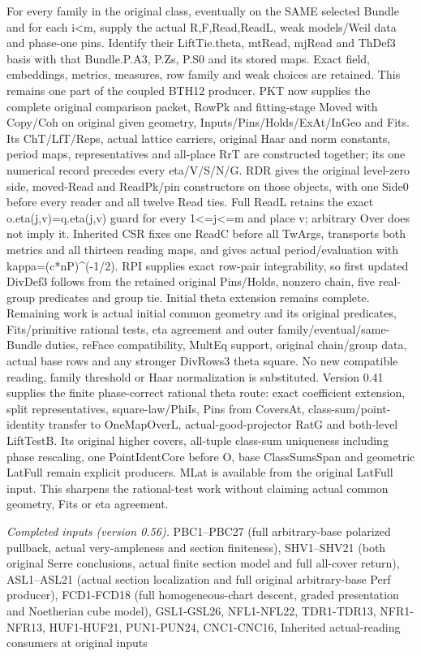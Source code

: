 \documentclass[11pt,a4paper]{article}
\numberwithin{equation}{section}
\theoremstyle{remark}\newtheorem{remark}[theorem]{Remark}
\begin{document}
For every family in the original class, eventually on the SAME selected Bundle and for each i<m, supply the actual R,F,Read,ReadL, weak models/Weil data and phase-one pins. Identify their LiftTie.theta, mtRead, mjRead and ThDef3 basis with that Bundle.P.A3, P.Zs, P.S0 and its stored maps. Exact field, embeddings, metrics, measures, row family and weak choices are retained. This remains one part of the coupled BTH12 producer. PKT now supplies the complete original comparison packet, RowPk and fitting-stage Moved with Copy/Coh on original given geometry, Inputs/Pins/Holds/ExAt/InGeo and Fits. Its ChT/LfT/Reps, actual lattice carriers, original Haar and norm constants, period maps, representatives and all-place RrT are constructed together; its one numerical record precedes every eta/V/S/N/G. RDR gives the original level-zero side, moved-Read and ReadPk/pin constructors on those objects, with one Side0 before every reader and all twelve Read ties. Full ReadL retains the exact o.eta(j,v)=q.eta(j,v) guard for every 1<=j<=m and place v; arbitrary Over does not imply it. Inherited CSR fixes one ReadC before all TwArgs, transports both metrics and all thirteen reading maps, and gives actual period/evaluation with kappa=(c*nP)\textasciicircum{}(-1/2). RPI supplies exact row-pair integrability, so first updated DivDef3 follows from the retained original Pins/Holds, nonzero chain, five real-group predicates and group tie. Initial theta extension remains complete. Remaining work is actual initial common geometry and its original predicates, Fits/primitive rational tests, eta agreement and outer family/eventual/same-Bundle duties, reFace compatibility, MultEq support, original chain/group data, actual base rows and any stronger DivRows3 theta square. No new compatible reading, family threshold or Haar normalization is substituted. Version 0.41 supplies the finite phase-correct rational theta route: exact coefficient extension, split representatives, square-law/PhiIs, Pins from CoversAt, class-sum/point-identity transfer to OneMapOverL, actual-good-projector RatG and both-level LiftTestB. Its original higher covers, all-tuple class-sum uniqueness including phase rescaling, one PointIdentCore before O, base ClassSumsSpan and geometric LatFull remain explicit producers. MLat is available from the original LatFull input. This sharpens the rational-test work without claiming actual common geometry, Fits or eta agreement.

\emph{Completed inputs (version 0.56).} PBC1–PBC27 (full arbitrary-base polarized pullback, actual very-ampleness and section finiteness), SHV1–SHV21 (both original Serre conclusions, actual finite section model and full all-cover return), ASL1–ASL21 (actual section localization and full original arbitrary-base Perf producer), FCD1-FCD18 (full homogeneous-chart descent, graded presentation and Noetherian cube model), GSL1-GSL26, NFL1-NFL22, TDR1-TDR13, NFR1-NFR13, HUF1-HUF21, PUN1-PUN24, CNC1-CNC16, Inherited actual-reading consumers at original inputs
\end{document}
